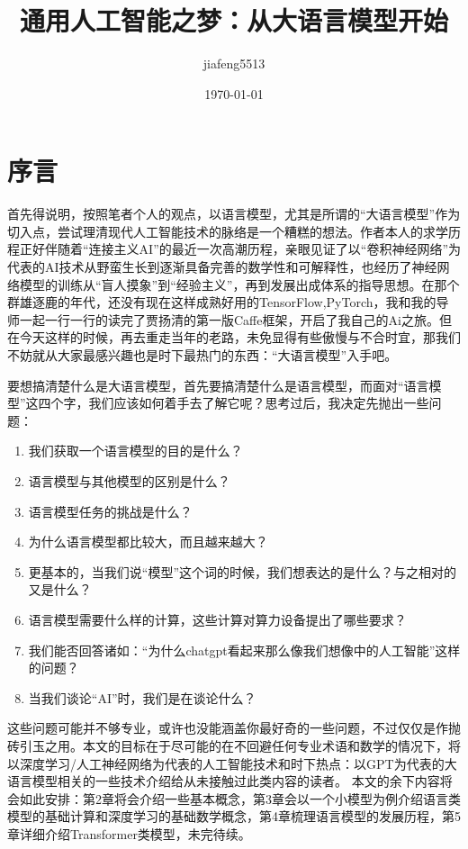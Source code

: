 \documentclass{article}
\title{通用人工智能之梦：从大语言模型开始}
\author{jiafeng5513}
\date{\today}
\begin{document}
\maketitle
\section{序言}
首先得说明，按照笔者个人的观点，以语言模型，尤其是所谓的“大语言模型”作为切入点，尝试理清现代人工智能技术的脉络是一个糟糕的想法。作者本人的求学历程正好伴随着“连接主义AI”的最近一次高潮历程，亲眼见证了以“卷积神经网络”为代表的AI技术从野蛮生长到逐渐具备完善的数学性和可解释性，也经历了神经网络模型的训练从“盲人摸象”到“经验主义”，再到发展出成体系的指导思想。在那个群雄逐鹿的年代，还没有现在这样成熟好用的TensorFlow,PyTorch，我和我的导师一起一行一行的读完了贾扬清的第一版Caffe框架，开启了我自己的Ai之旅。但在今天这样的时候，再去重走当年的老路，未免显得有些傲慢与不合时宜，那我们不妨就从大家最感兴趣也是时下最热门的东西：“大语言模型”入手吧。

要想搞清楚什么是大语言模型，首先要搞清楚什么是语言模型，而面对“语言模型”这四个字，我们应该如何着手去了解它呢？思考过后，我决定先抛出一些问题：
\begin{enumerate}
    \item 我们获取一个语言模型的目的是什么？
    \item 语言模型与其他模型的区别是什么？
    \item 语言模型任务的挑战是什么？
    \item 为什么语言模型都比较大，而且越来越大？
    \item 更基本的，当我们说“模型”这个词的时候，我们想表达的是什么？与之相对的又是什么？
    \item 语言模型需要什么样的计算，这些计算对算力设备提出了哪些要求？
    \item 我们能否回答诸如：“为什么chatgpt看起来那么像我们想像中的人工智能”这样的问题？
    \item 当我们谈论“AI”时，我们是在谈论什么？
\end{enumerate}

这些问题可能并不够专业，或许也没能涵盖你最好奇的一些问题，不过仅仅是作抛砖引玉之用。本文的目标在于尽可能的在不回避任何专业术语和数学的情况下，将以深度学习/人工神经网络为代表的人工智能技术和时下热点：以GPT为代表的大语言模型相关的一些技术介绍给从未接触过此类内容的读者。
本文的余下内容将会如此安排：第2章将会介绍一些基本概念，第3章会以一个小模型为例介绍语言类模型的基础计算和深度学习的基础数学概念，第4章梳理语言模型的发展历程，第5章详细介绍Transformer类模型，未完待续。
\end{document}
